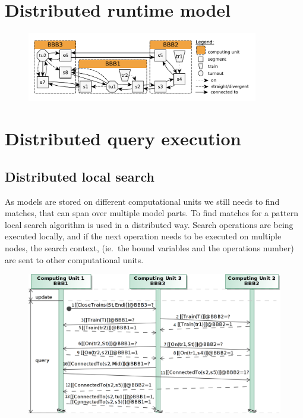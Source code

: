 \section{Distributed runtime model}

\begin{figure}[h]
	\begin{center}
		\includegraphics[width=0.9\textwidth]{figures/runtime-snapshot.pdf}
	\end{center}
\end{figure}


\section{Distributed query execution}


\subsection{Distributed local search}

As models are stored on different computational units we still needs to find matches, that can span over multiple model parts. To find matches for a pattern local search algorithm is used in a distributed way. Search operations are being executed locally, and if the next operation needs to be executed on multiple nodes, the search context, (ie.\ the bound variables and the operations number) are sent to other computational units.

\begin{figure}[h]
	\begin{center}
		\includegraphics[width=1\textwidth]{figures/seq-diagram-query-exec.png}
	\end{center}
\end{figure}

